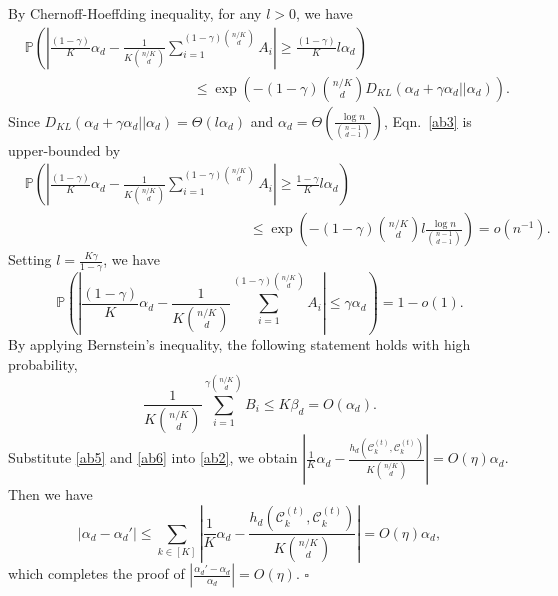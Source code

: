 \documentclass{article}
\newcommand\af{\alpha_d}
\newcommand\bt{\beta_d}
\begin{document}
By Chernoff-Hoeffding inequality, for any $l>0$, we have
\begin{equation}\label{ab3}
    \begin{aligned}
        &\mathbb{P} \left( \left| \frac{(1-\gamma)}{K} \af - \frac{1}{K\binom{n/K}{d}} \sum_{i=1}^{(1-\gamma)\binom{n/K}{d}} A_i \right| \geq  \frac{(1- \gamma) }{K} l \af \right) \\
        &\qquad  \qquad \qquad \qquad \qquad \qquad \le \exp \left( -(1-\gamma) \binom{n/K}{d} D_{KL} \left(\af +\gamma \af \bigg| \bigg| \af\right) \right).
    \end{aligned}	
\end{equation}
Since $ D_{KL} \left(\af +\gamma \af \bigg| \bigg| \af\right) = \Theta(l \af)$ and $\af = \Theta \left( \frac{\log n}{\binom{n-1}{d-1}} \right)$, Eqn.~\eqref{ab3} is upper-bounded by
\begin{equation}\label{ab4}
    \begin{aligned}
        &\mathbb{P} \left( \left| \frac{(1-\gamma)}{K} \af - \frac{1}{K\binom{n/K}{d}} \sum_{i=1}^{(1-\gamma)\binom{n/K}{d}} A_i \right| \geq  \frac{1- \gamma }{K} l \af \right) \\
        &\qquad \qquad \qquad \qquad \qquad \qquad \qquad \qquad  \le \exp \left( -(1-\gamma) \binom{n/K}{d} l  \frac{\log n}{\binom{n-1}{d-1}} \right)  = o(n^{-1}).
    \end{aligned}	
\end{equation}
Setting $l=\frac{K \gamma}{1-\gamma}$, we have
\begin{equation}\label{ab5}
	\mathbb{P} \left( \left| \frac{(1-\gamma)}{K} \af - \frac{1}{K\binom{n/K}{d}} \sum_{i=1}^{(1-\gamma)\binom{n/K}{d}} A_i \right|  \leq \gamma \af \right) = 1- o(1).
\end{equation}
By applying Bernstein's inequality, the following statement holds with high probability,
\begin{equation}\label{ab6}
	\frac{1}{K\binom{n/K}{d}} \sum_{i=1}^{\gamma \binom{n/K}{d}} B_i \leq K \bt = O(\af).
\end{equation}
Substitute \eqref{ab5} and \eqref{ab6} into \eqref{ab2}, we obtain $\left| \frac{1}{K} \af - \frac{h_d(\mathcal{C}_k^{(t)}, \mathcal{C}_k^{(t)})}{K\binom{n/K}{d}}  \right| = O(\eta) \af$.  Then we have  
$$
\left| \af - \alpha_d' \right| \leq \sum_{k \in [K]} \left| \frac{1}{K} \af - \frac{h_d(\mathcal{C}_k^{(t)}, \mathcal{C}_k^{(t)})}{K\binom{n/K}{d}}  \right|   = O(\eta) \af,
$$
which completes the proof of $\left| \frac{\alpha_d'-\af }{\af } \right| = O(\eta)$.
 \hfill $\square$\par
\end{document}
